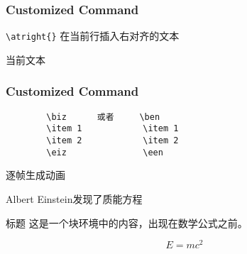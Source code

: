 \begin{frame}[fragile]
    \frametitle{Customized Command}
    \verb*|\atright{}|
    在当前行插入右对齐的文本

    当前文本
\end{frame}

\begin{frame}[fragile]
    \frametitle{Customized Command}
    \begin{verbatim}
        \biz      或者     \ben
        \item 1            \item 1
        \item 2            \item 2
        \eiz               \een
    \end{verbatim}
    逐帧生成动画
    
   	Albert Einstein发现了质能方程
\end{frame}

\begin{frame}
    \begin{block}{标题}
        这是一个块环境中的内容，出现在数学公式之前。
    \end{block}
    
    \begin{equation*}
        E = m c^2
    \end{equation*}
\end{frame}